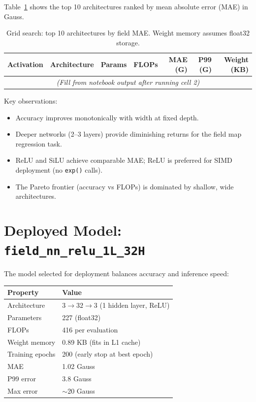 \documentclass[11pt,a4paper]{article}
\begin{document}
Table~\ref{tab:grid_search} shows the top 10 architectures ranked by mean
absolute error (MAE) in Gauss.

\begin{table}[htbp]
\centering
\caption{Grid search: top 10 architectures by field MAE. Weight memory
  assumes float32 storage.}
\label{tab:grid_search}
\begin{tabular}{llrrrrr}
\toprule
Activation & Architecture & Params & FLOPs & MAE (G) & P99 (G) & Weight (KB) \\
\midrule
\multicolumn{7}{c}{\emph{(Fill from notebook output after running cell 2)}} \\
\bottomrule
\end{tabular}
\end{table}

Key observations:
\begin{itemize}[nosep]
  \item Accuracy improves monotonically with width at fixed depth.
  \item Deeper networks (2--3 layers) provide diminishing returns for the
        field map regression task.
  \item ReLU and SiLU achieve comparable MAE; ReLU is preferred for SIMD
        deployment (no \texttt{exp()} calls).
  \item The Pareto frontier (accuracy vs FLOPs) is dominated by shallow,
        wide architectures.
\end{itemize}

\section{Deployed Model: \texttt{field\_nn\_relu\_1L\_32H}}
\label{sec:deployed}

The model selected for deployment balances accuracy and inference speed:

\begin{center}
\begin{tabular}{ll}
\toprule
Property & Value \\
\midrule
Architecture     & $3 \to 32 \to 3$ (1 hidden layer, ReLU) \\
Parameters       & 227 (float32) \\
FLOPs            & 416 per evaluation \\
Weight memory    & 0.89 KB (fits in L1 cache) \\
Training epochs  & 200 (early stop at best epoch) \\
MAE              & 1.02 Gauss \\
P99 error        & 3.8 Gauss \\
Max error        & $\sim$20 Gauss \\
\bottomrule
\end{tabular}
\end{center}
\end{document}
